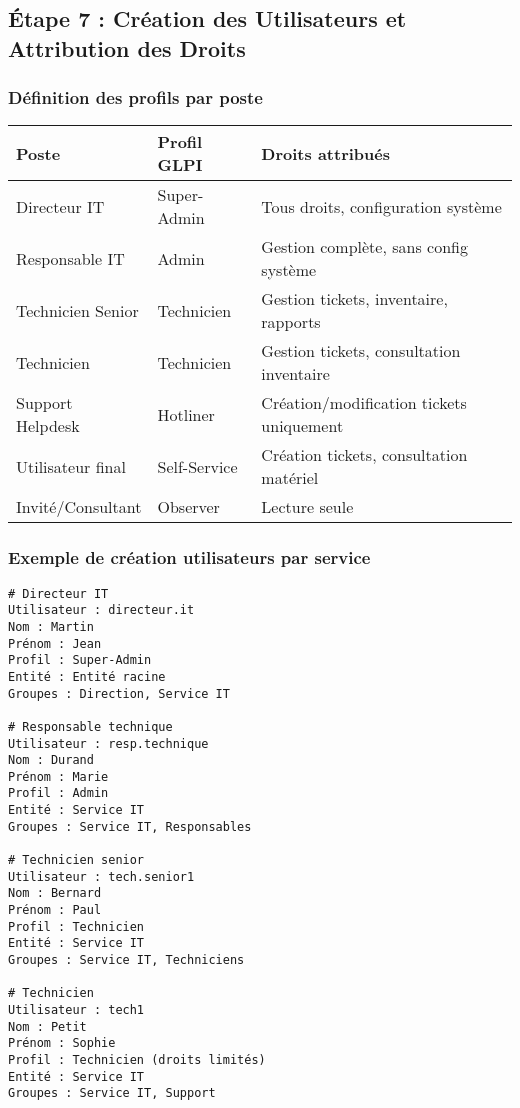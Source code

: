 \documentclass[12pt,a4paper]{article}
\begin{document}
\subsection{Étape 7 : Création des Utilisateurs et Attribution des Droits}

\subsubsection{Définition des profils par poste}
\begin{center}
\begin{tabular}{|l|l|l|}
\hline
\textbf{Poste} & \textbf{Profil GLPI} & \textbf{Droits attribués} \\
\hline
Directeur IT & Super-Admin & Tous droits, configuration système \\
Responsable IT & Admin & Gestion complète, sans config système \\
Technicien Senior & Technicien & Gestion tickets, inventaire, rapports \\
Technicien & Technicien & Gestion tickets, consultation inventaire \\
Support Helpdesk & Hotliner & Création/modification tickets uniquement \\
Utilisateur final & Self-Service & Création tickets, consultation matériel \\
Invité/Consultant & Observer & Lecture seule \\
\hline
\end{tabular}
\end{center}

\subsubsection{Exemple de création utilisateurs par service}
\begin{lstlisting}[caption=Utilisateurs Service Informatique]
# Directeur IT
Utilisateur : directeur.it
Nom : Martin
Prénom : Jean
Profil : Super-Admin
Entité : Entité racine
Groupes : Direction, Service IT

# Responsable technique
Utilisateur : resp.technique
Nom : Durand
Prénom : Marie
Profil : Admin  
Entité : Service IT
Groupes : Service IT, Responsables

# Technicien senior
Utilisateur : tech.senior1
Nom : Bernard
Prénom : Paul
Profil : Technicien
Entité : Service IT
Groupes : Service IT, Techniciens

# Technicien
Utilisateur : tech1
Nom : Petit
Prénom : Sophie
Profil : Technicien (droits limités)
Entité : Service IT
Groupes : Service IT, Support
\end{lstlisting}
\end{document}

